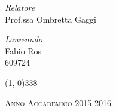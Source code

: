 \begin{titlepage}
\begin{center}
\vspace{40pt} 

\begin{large}
\begin{flushleft}
\textit{Relatore}\\ 
\vspace{5pt} 
Prof.ssa Ombretta Gaggi
\end{flushleft}

\vspace{0pt} 

\begin{flushright}
\textit{Laureando}\\ 
\vspace{5pt} 
Fabio Ros \\
609724
\end{flushright}
\end{large}

\vspace{40pt}

\line(1, 0){338} \\
\begin{normalsize}
\textsc{Anno Accademico 2015-2016}
\end{normalsize}

\end{center}
\end{titlepage}

%